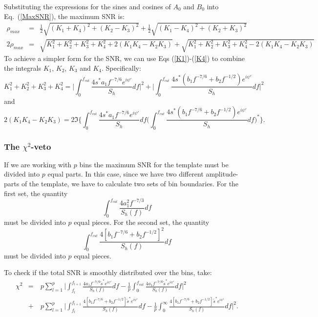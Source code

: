 Substituting the expressions for the sines and cosines of $A_0$ and
$B_0$
into Eq.~(\ref{MaxSNR}), the maximum SNR is:
\begin{eqnarray}
 \rho_{max} &=& \frac{1}{2} \sqrt{(K_1+K_4)^2 + (K_2-K_3)^2} +
\frac{1}{2} \sqrt{(K_1-K_4)^2 +(K_2+K_3)^2}\\
2\rho_{max}&=& \sqrt{ K_1^2 + K_2^2 + K_3^2 +K_4^2 + 2(K_1 K_4
	- K_2 K_3)} + \sqrt{  K_1^2 + K_2^2 + K_3^2 +K_4^2 -2(K_1
	K_4 -  K_2 K_3)} 
\end{eqnarray}
To achieve a simpler form for the SNR, we can use Eqs (\ref{K1})-(\ref{K4}) to 
combine the integrals $K_1$, $K_2$, $K_3$ and $K_4$.
Specifically:
\begin{equation}
K_1^2 + K_2^2 + K_3^2 + K_4^2 = \Big | \int_0^{f_{cut}} \frac{4 s^{\ast} a_1
	f^{-7/6} e^{i \psi'}}{S_h} df \Big |^2 + \Big | \int_0^{f_{cut}}
	\frac{4 s^{\ast} (b_1 f^{-7/6} + b_2 f^{-1/2}) e^{i \psi'}}{S_h} df
	\Big |^2
\end{equation}
and
\begin{equation}
2(K_1 K_4- K_2 K_3) =  2 \Im \Big \{ \int_0^{f_{cut}} \frac{4 s^{\ast} a_1
	f^{-7/6} e^{i \psi'}}{S_h} df \Big (\int_0^{f_{cut}} \frac{4 s^{\ast}
	(b_1 f^{-7/6} + b_2 f^{-1/2}) e^{i \psi'}}{S_h}df\Big )^{\ast} \Big \}.
\end{equation}

\subsubsection*{The $\chi^2$-veto}
\label{ChisquaredVeto}

If we are working with $p$ bins the maximum SNR for the template must be 
divided into $p$ equal parts. In this case, since we have two different 
amplitude-parts of the template, we have to calculate two sets of bin
boundaries.
For the first set, the quantity
\begin{displaymath}
\int_0^{f_{cut}} \frac{4 a_1^2 f^{-7/3}}{S_h(f)} df
\end{displaymath}
must be divided into $p$ equal pieces.
For the second set, the quantity
\begin{displaymath}
\int_0^{f_{cut}} \frac{4 [b_1 f^{-7/6} + b_2 f^{-1/2}]^2}{S_h(f)} df
\end{displaymath} 
must be divided into $p$ equal pieces.

To check if the total SNR is smoothly distributed over the bins,
take:
\begin{eqnarray}
\chi^2 &=& \: p \sum_{l=1}^p  \Big | \int_{f_l}^{f_{l+1}} \frac{4 a_1 
     f^{-7/6} \tilde{s}^{\ast} e^{i \psi'}}{S_h(f)} df
     - \frac{1}{p} \int_{0}^{f_{cut}} \frac{4 a_1 f^{-7/6}
 \tilde{s}^{\ast} e^{i \psi'}}{S_h(f)} df \Big |^2 \\
      &+&\: p\sum_{l=1}^p\Big | \int_{f_l}^{f_{l+1}} \frac{4[b_1 f^{-7/6}
	+ b_2 f^{-1/2} ]
     \tilde{s}^{\ast} e^{i \psi'}}{S_h(f)} df-\frac{1}{p} 
     \int_{0}^{\infty} \frac{4[b_1 f^{-7/6} + b_2 f^{-1/2}]
\tilde{s}^{\ast} e^{i \psi'}}{S_h(f)} df\Big |^2. \\
\end{eqnarray}


